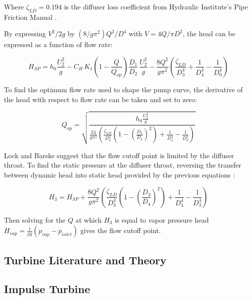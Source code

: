 Where $\zeta_{LD}=0.194$ is the diffuser loss coefficient from Hydraulic Institute's Pipe Friction Manual \cite{hydraulicpipemanual}.

By expressing $V^2/2g$ by $(8/g\pi^2)Q^2/D^4$ with $V=4Q/\pi D^2$, the head can be expressed as a function of flow rate:

\begin{equation}
    H_{SP} = h_0\frac{U_2^2}{g} - C_H\,K_1\!\left(1-\frac{Q}{Q_{op}}\right)\!\frac{D_1}{D_2}\,\frac{U_2^2}{g} - \frac{8Q^2}{g\pi^2}\left(\frac{\zeta_{LD}}{D_3^4} + \frac{1}{D_4^4} - \frac{1}{D_0^4}\right)
    \label{eq:lock_static_head_flow}
\end{equation}

To find the optimum flow rate used to shape the pump curve, the derivative of the head with respect to flow rate can be taken and set to zero:

\begin{equation}
    Q_{op} = \sqrt{\frac{h_0\frac{U_2^2}{g}}{\frac{24}{g\pi^2}\left(\frac{\zeta_{LD}}{D_3^4}\left(1-\left(\tfrac{D_3}{D_4}\right)^2\right) + \frac{1}{D_4^4} - \frac{1}{D_0^4}\right)}}
    \label{eq:lock_optimum_flow}
\end{equation}

Lock and Barske suggest that the flow cutoff point is limited by the diffuser throat. To find the static pressure at the diffuser throat, reversing the transfer between dynamic head into static head provided by the previous equations :

\begin{equation}
    H_3 = H_{SP} + \frac{8Q^2}{g\pi^2}\left(\frac{\zeta_{LD}}{D_3^4}\left(1-\left(\frac{D_3}{D_4}\right)^2\right) + \frac{1}{D_4^4} - \frac{1}{D_3^4}\right)
    \label{eq:lock_diffuser_throat}
\end{equation}

Then solving for the $Q$ at which $H_3$ is equal to vapor pressure head $H_{vap}=\frac{1}{\rho g}\left(p_{vap}-p_{inlet}\right)$ gives the flow cutoff point.



\subsection{Turbine Literature and Theory}

\subsection{Impulse Turbine}

